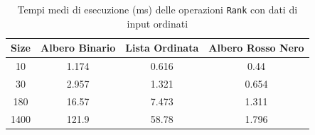 \documentclass[10pt]{article}
\begin{document}
\begin{table}[H]
\centering
\begin{tabular}{|c|c|c|c|}
\hline
\textbf{Size} & \textbf{Albero Binario} & \textbf{Lista Ordinata} & \textbf{Albero Rosso Nero} \\
\hline
10     & 1.174 & 0.616 & 0.44 \\
30     & 2.957 & 1.321  & 0.654 \\
180    & 16.57 & 7.473  & 1.311 \\
1400   & 121.9 & 58.78  & 1.796 \\
\hline
\end{tabular}
\caption{Tempi medi di esecuzione (ms) delle operazioni \texttt{Rank} con dati di input ordinati}
\label{tab:confronto-rank-sorted}
\end{table}
\end{document}
